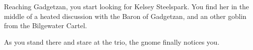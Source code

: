 Reaching Gadgetzan, you start looking for Kelsey Steelspark. You find her in the middle of a heated discussion with the Baron of Gadgetzan, and an other goblin from the Bilgewater Cartel.


As you stand there and stare at the trio, the gnome finally notices you.


